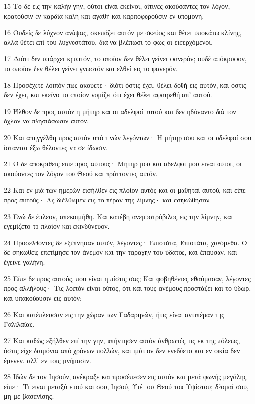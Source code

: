 \par 15 Το δε εις την καλήν γην, ούτοι είναι εκείνοι, οίτινες ακούσαντες τον λόγον, κρατούσιν εν καρδία καλή και αγαθή και καρποφορούσιν εν υπομονή.
\par 16 Ουδείς δε λύχνον ανάψας, σκεπάζει αυτόν με σκεύος και θέτει υποκάτω κλίνης, αλλά θέτει επί του λυχνοστάτου, διά να βλέπωσι το φως οι εισερχόμενοι.
\par 17 Διότι δεν υπάρχει κρυπτόν, το οποίον δεν θέλει γείνει φανερόν; ουδέ απόκρυφον, το οποίον δεν θέλει γείνει γνωστόν και ελθεί εις το φανερόν.
\par 18 Προσέχετε λοιπόν πως ακούετε· διότι όστις έχει, θέλει δοθή εις αυτόν, και όστις δεν έχει, και εκείνο το οποίον νομίζει ότι έχει θέλει αφαιρεθή απ' αυτού.
\par 19 Ήλθον δε προς αυτόν η μήτηρ και οι αδελφοί αυτού και δεν ηδύναντο διά τον όχλον να πλησιάσωσιν αυτόν.
\par 20 Και απηγγέλθη προς αυτόν υπό τινών λεγόντων· Η μήτηρ σου και οι αδελφοί σου ίστανται έξω θέλοντες να σε ίδωσιν.
\par 21 Ο δε αποκριθείς είπε προς αυτούς· Μήτηρ μου και αδελφοί μου είναι ούτοι, οι ακούοντες τον λόγον του Θεού και πράττοντες αυτόν.
\par 22 Και εν μιά των ημερών εισήλθεν εις πλοίον αυτός και οι μαθηταί αυτού, και είπε προς αυτούς· Ας διέλθωμεν εις το πέραν της λίμνης· και εσηκώθησαν.
\par 23 Ενώ δε έπλεον, απεκοιμήθη. Και κατέβη ανεμοστρόβιλος εις την λίμνην, και εγεμίζετο το πλοίον και εκινδύνευον.
\par 24 Προσελθόντες δε εξύπνησαν αυτόν, λέγοντες· Επιστάτα, Επιστάτα, χανόμεθα. Ο δε σηκωθείς επετίμησε τον άνεμον και την ταραχήν του ύδατος, και έπαυσαν, και έγεινε γαλήνη.
\par 25 Είπε δε προς αυτούς, που είναι η πίστις σας; Και φοβηθέντες εθαύμασαν, λέγοντες προς αλλήλους· Τις λοιπόν είναι ούτος, ότι και τους ανέμους προστάζει και το ύδωρ, και υπακούουσιν εις αυτόν;
\par 26 Και κατέπλευσαν εις την χώραν των Γαδαρηνών, ήτις είναι αντιπέραν της Γαλιλαίας.
\par 27 Και καθώς εξήλθεν επί την γην, υπήντησεν αυτόν άνθρωπός τις εκ της πόλεως, όστις είχε δαιμόνια από χρόνων πολλών, και ιμάτιον δεν ενεδύετο και εν οικία δεν έμενεν, αλλ' εν τοις μνήμασιν.
\par 28 Ιδών δε τον Ιησούν, ανέκραξε και προσέπεσεν εις αυτόν και μετά φωνής μεγάλης είπε· Τι είναι μεταξύ εμού και σου, Ιησού, Υιέ του Θεού του Υψίστου; δέομαί σου, μη με βασανίσης.
